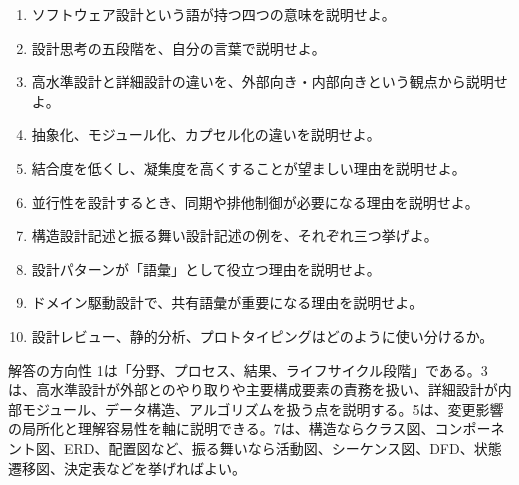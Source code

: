 \documentclass[10.5pt,a4paper]{ltjsarticle}
\begin{document}
\begin{enumerate}
  \item ソフトウェア設計という語が持つ四つの意味を説明せよ。
  \item 設計思考の五段階を、自分の言葉で説明せよ。
  \item 高水準設計と詳細設計の違いを、外部向き・内部向きという観点から説明せよ。
  \item 抽象化、モジュール化、カプセル化の違いを説明せよ。
  \item 結合度を低くし、凝集度を高くすることが望ましい理由を説明せよ。
  \item 並行性を設計するとき、同期や排他制御が必要になる理由を説明せよ。
  \item 構造設計記述と振る舞い設計記述の例を、それぞれ三つ挙げよ。
  \item 設計パターンが「語彙」として役立つ理由を説明せよ。
  \item ドメイン駆動設計で、共有語彙が重要になる理由を説明せよ。
  \item 設計レビュー、静的分析、プロトタイピングはどのように使い分けるか。
\end{enumerate}

\begin{pointbox}{解答の方向性}
1は「分野、プロセス、結果、ライフサイクル段階」である。3は、高水準設計が外部とのやり取りや主要構成要素の責務を扱い、詳細設計が内部モジュール、データ構造、アルゴリズムを扱う点を説明する。5は、変更影響の局所化と理解容易性を軸に説明できる。7は、構造ならクラス図、コンポーネント図、ERD、配置図など、振る舞いなら活動図、シーケンス図、DFD、状態遷移図、決定表などを挙げればよい。
\end{pointbox}
\end{document}
